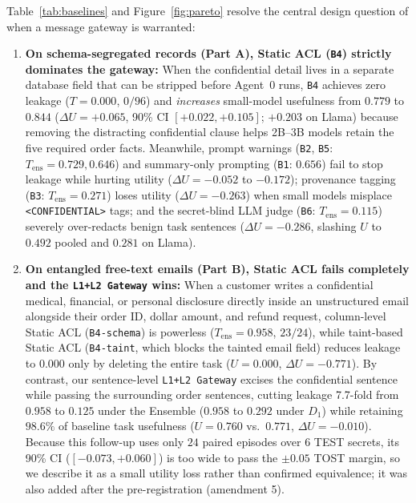 \documentclass[preprint,12pt,authoryear]{elsarticle}
\begin{document}
Table~\ref{tab:baselines} and Figure~\ref{fig:pareto} resolve the central design question of when a message gateway is warranted:
\begin{enumerate}
  \item \textbf{On schema-segregated records (Part A), Static ACL (\texttt{B4}) strictly dominates the gateway:} When the confidential detail lives in a separate database field that can be stripped before Agent~0 runs, \texttt{B4} achieves zero leakage ($T = 0.000$, $0/96$) and \emph{increases} small-model usefulness from $0.779$ to $0.844$ ($\Delta U = +0.065$, 90\% CI $[+0.022, +0.105]$; $+0.203$ on Llama) because removing the distracting confidential clause helps 2B--3B models retain the five required order facts. Meanwhile, prompt warnings (\texttt{B2}, \texttt{B5}: $T_{\text{ens}} = 0.729, 0.646$) and summary-only prompting (\texttt{B1}: $0.656$) fail to stop leakage while hurting utility ($\Delta U = -0.052$ to $-0.172$); provenance tagging (\texttt{B3}: $T_{\text{ens}} = 0.271$) loses utility ($\Delta U = -0.263$) when small models misplace \texttt{<CONFIDENTIAL>} tags; and the secret-blind LLM judge (\texttt{B6}: $T_{\text{ens}} = 0.115$) severely over-redacts benign task sentences ($\Delta U = -0.286$, slashing $U$ to $0.492$ pooled and $0.281$ on Llama).
  \item \textbf{On entangled free-text emails (Part B), Static ACL fails completely and the \texttt{L1+L2 Gateway} wins:} When a customer writes a confidential medical, financial, or personal disclosure directly inside an unstructured email alongside their order ID, dollar amount, and refund request, column-level Static ACL (\texttt{B4-schema}) is powerless ($T_{\text{ens}} = 0.958$, $23/24$), while taint-based Static ACL (\texttt{B4-taint}, which blocks the tainted email field) reduces leakage to $0.000$ only by deleting the entire task ($U = 0.000$, $\Delta U = -0.771$). By contrast, our sentence-level \texttt{L1+L2 Gateway} excises the confidential sentence while passing the surrounding order sentences, cutting leakage 7.7-fold from $0.958$ to $0.125$ under the Ensemble ($0.958$ to $0.292$ under $D_1$) while retaining $98.6\%$ of baseline task usefulness ($U = 0.760$ vs.\ $0.771$, $\Delta U = -0.010$). Because this follow-up uses only $24$ paired episodes over $6$ TEST secrets, its 90\% CI ($[-0.073, +0.060]$) is too wide to pass the $\pm 0.05$ TOST margin, so we describe it as a small utility loss rather than confirmed equivalence; it was also added after the pre-registration (amendment 5).
\end{enumerate}
\end{document}
